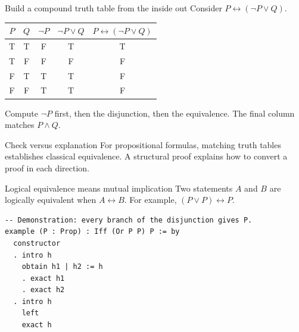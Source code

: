 \begin{frame}{Build a compound truth table from the inside out}
Consider $P\leftrightarrow(\neg P\lor Q)$.
\begin{center}
\begin{tabular}{cc|c|c|c}
\toprule
$P$&$Q$&$\neg P$&$\neg P\lor Q$&$P\leftrightarrow(\neg P\lor Q)$\\\midrule
T&T&F&T&T\\
T&F&F&F&F\\
F&T&T&T&F\\
F&F&T&T&F\\\bottomrule
\end{tabular}
\end{center}
Compute $\neg P$ first, then the disjunction, then the equivalence.
The final column matches $P\land Q$.
\begin{block}{Check versus explanation}
For propositional formulas, matching truth tables establishes classical equivalence. A structural proof explains how to convert a proof in each direction.
\end{block}
\end{frame}

\begin{frame}[fragile]{Logical equivalence means mutual implication}
Two statements $A$ and $B$ are logically equivalent when $A\leftrightarrow B$.
For example, $(P\lor P)\leftrightarrow P$.
\begin{lstlisting}
-- Demonstration: every branch of the disjunction gives P.
example (P : Prop) : Iff (Or P P) P := by
  constructor
  . intro h
    obtain h1 | h2 := h
    . exact h1
    . exact h2
  . intro h
    left
    exact h
\end{lstlisting}
\end{frame}

